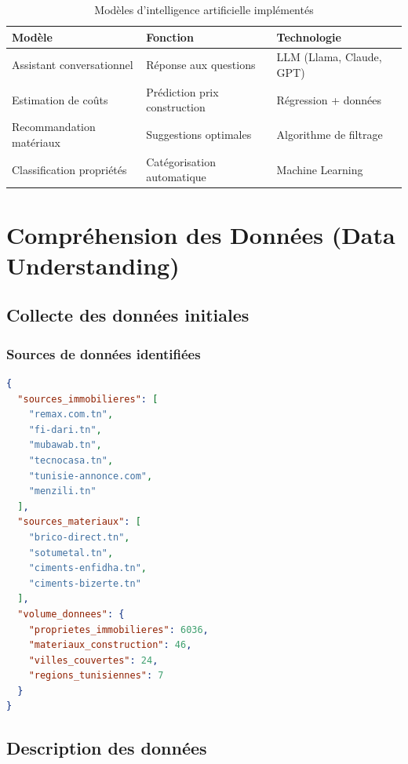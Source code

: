 \documentclass[12pt,a4paper]{report}
\begin{document}
\begin{table}[H]
    \centering
    \caption{Modèles d'intelligence artificielle implémentés}
    \begin{tabular}{|l|l|l|}
        \hline
        \textbf{Modèle} & \textbf{Fonction} & \textbf{Technologie} \\
        \hline
        Assistant conversationnel & Réponse aux questions & LLM (Llama, Claude, GPT) \\
        \hline
        Estimation de coûts & Prédiction prix construction & Régression + données \\
        \hline
        Recommandation matériaux & Suggestions optimales & Algorithme de filtrage \\
        \hline
        Classification propriétés & Catégorisation automatique & Machine Learning \\
        \hline
    \end{tabular}
\end{table}

\chapter{Compréhension des Données (Data Understanding)}

\section{Collecte des données initiales}

\subsection{Sources de données identifiées}

\begin{lstlisting}[caption=Structure des sources de données JSON, language=json]
{
  "sources_immobilieres": [
    "remax.com.tn",
    "fi-dari.tn", 
    "mubawab.tn",
    "tecnocasa.tn",
    "tunisie-annonce.com",
    "menzili.tn"
  ],
  "sources_materiaux": [
    "brico-direct.tn",
    "sotumetal.tn",
    "ciments-enfidha.tn",
    "ciments-bizerte.tn"
  ],
  "volume_donnees": {
    "proprietes_immobilieres": 6036,
    "materiaux_construction": 46,
    "villes_couvertes": 24,
    "regions_tunisiennes": 7
  }
}
\end{lstlisting}

\section{Description des données}
\end{document}

